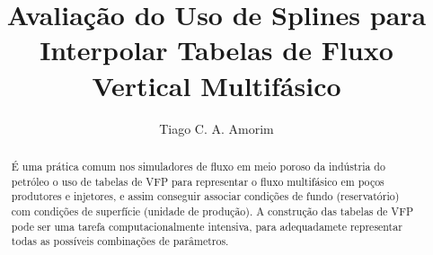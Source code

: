 \documentclass[final,5p]{elsarticle}
\numberwithin{equation}{section}
\begin{document}
\begin{frontmatter}



\title{Avaliação do Uso de Splines para Interpolar Tabelas de Fluxo Vertical Multifásico}


\author{Tiago C. A. Amorim}

\begin{abstract}

    É uma prática comum nos simuladores de fluxo em meio poroso da indústria do petróleo o uso de tabelas de VFP para representar o fluxo multifásico em poços produtores e injetores, e assim conseguir associar condições de fundo (reservatório) com condições de superfície (unidade de produção). A construção das tabelas de VFP pode ser uma tarefa computacionalmente intensiva, para adequadamete representar todas as possíveis combinações de parâmetros.


\end{abstract}
\end{frontmatter}
\end{document}
